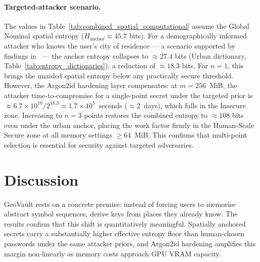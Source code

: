 \documentclass[journal,article,submit,pdftex,moreauthors]{Definitions/mdpi}
\newcommand{\add}[1]{#1}
\newcommand{\remove}[1]{}
\newcommand{\add}[1]{\added{#1}}
\newcommand{\remove}[1]{\deleted{#1}}
\begin{document}
\paragraph{\add{Targeted-attacker scenario.}} \add{The values in Table~\ref{tab:combined_spatial_computational} assume the Global Nominal spatial entropy ($H_{\text{anchor}} \approx 45.7$ bits). For a demographically informed attacker who knows the user's city of residence — a scenario supported by findings in~\cite{Sun2012, Thorpe2013, AlAmeen2014} — the anchor entropy collapses to $\approx 27.4$ bits (Urban dictionary, Table~\ref{tab:entropy_dictionaries}), a reduction of $\approx 18.3$ bits. For $n=1$, this brings the unaided spatial entropy below any practically secure threshold. However, the Argon2id hardening layer compensates: at $m = 256$~MiB, the attacker time-to-compromise for a single-point secret under the targeted prior is $\approx 6.7 \times 10^{10} / 2^{18.3} \approx 1.7 \times 10^{5}$~seconds ($\approx 2$~days), which falls in the Insecure zone. Increasing to $n = 3$ points restores the combined entropy to $\approx 108$ bits even under the urban anchor, placing the work factor firmly in the Human-Scale Secure zone at all memory settings $\ge 64$~MiB. This confirms that multi-point selection is essential for security against targeted adversaries.}



\section{Discussion}

\remove{The results presented in this work show that spatial memory, when combined with modern memory-hard key derivation functions, can meaningfully reshape the traditional security-usability trade-off in cryptographic key management. Rather than attempting to force users to reliably generate or retain abstract high-entropy secrets, GeoVault leverages a cognitive domain in which humans demonstrate strong and durable recall. The empirical and analytical results indicate that spatially anchored secrets exhibit a substantially higher effective entropy floor than human-chosen passwords under realistic offline attacker models, and that this advantage can be amplified through hardware-bound computational hardening.}\add{GeoVault rests on a concrete premise: instead of forcing users to memorise abstract symbol sequences, derive keys from places they already know. The results confirm that this shift is quantitatively meaningful. Spatially anchored secrets carry a substantially higher effective entropy floor than human-chosen passwords under the same attacker priors, and Argon2id hardening amplifies this margin non-linearly as memory costs approach GPU VRAM capacity.}
\end{document}
